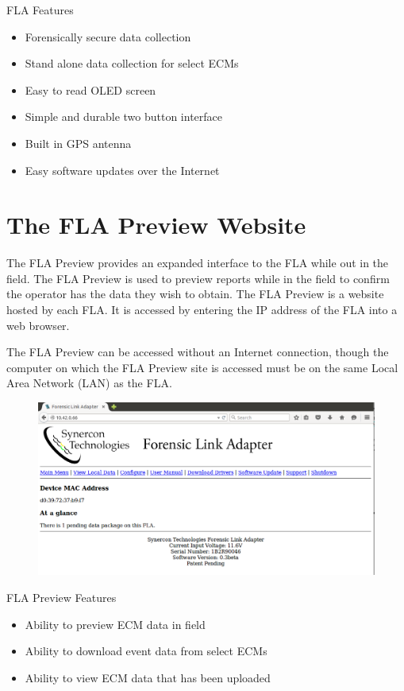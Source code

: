 \documentclass[11pt, oneside]{book}
\begin{document}
FLA Features
\begin{itemize}
	\item Forensically secure data collection
	\item Stand alone data collection for select ECMs
	\item Easy to read OLED screen
	\item Simple and durable two button interface
	\item Built in GPS antenna
	\item Easy software updates over the Internet
\end{itemize}


\section{The FLA Preview Website}
The FLA Preview provides an expanded interface to the FLA while out in the field. The FLA Preview is used to preview reports while in the field to confirm the operator has the data they wish to obtain. The FLA Preview is a website hosted by each FLA. It is accessed by
entering the IP address of the FLA into a web browser.

The FLA Preview can be accessed without an Internet connection, though the computer on which the FLA Preview site is accessed must be on the same Local Area Network (LAN) as the FLA.
\begin{figure}[H]
\begin{center}
\includegraphics[width=1\linewidth]{../media/fla_preview_screenshots/main_page}
\end{center}
\end{figure}
FLA Preview Features
\begin{itemize}
\item Ability to preview ECM data in field
\item Ability to download event data from select ECMs
\item Ability to view ECM data that has been uploaded
\end{itemize}
\newpage
\end{document}
